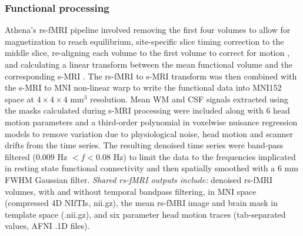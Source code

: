 \documentclass[preprint,12pt,3p]{elsarticle}
\begin{document}
\subsubsection{Functional processing} Athena's rs-fMRI pipeline involved removing the first four volumes to allow for magnetization to reach equilibrium, site-specific slice timing correction to the middle slice, re-aligning each volume to the first volume to correct for motion \cite{cox1999_motion}, and calculating a linear transform between the mean functional volume and the corresponding s-MRI \cite{jenkinson2002_flirt}. The rs-fMRI to s-MRI transform was then combined with the s-MRI to MNI non-linear warp to write the functional data into MNI152 space at $4\times4\times4$ mm$^3$ resolution. Mean WM and CSF signals extracted using the masks calculated during s-MRI processing were included along with 6 head motion parameters and a third-order polynomial in voxelwise nuisance regression models to remove variation due to physiological noise, head motion and scanner drifts from the time series\cite{lund2006_nvr,fox2005}. The resulting denoised time series were band-pass filtered ($0.009$ Hz $< f < 0.08$ Hz) to limit the data to the frequencies implicated in resting state functional connectivity \cite{biswal1995,cordes2001} and then spatially smoothed with a 6 mm FWHM Gaussian filter. \emph{Shared rs-fMRI outputs include:} denoised rs-fMRI volumes, with and without temporal bandpass filtering, in MNI space (compressed 4D NIfTIs, nii.gz), the mean rs-fMRI image and brain mask in template space (.nii.gz), and six parameter head motion traces (tab-separated values, AFNI .1D files). 
\end{document}
